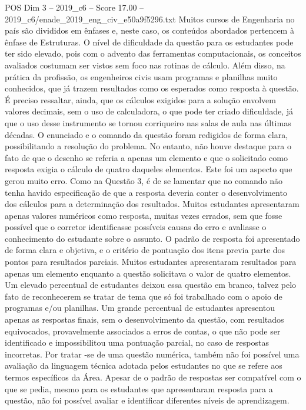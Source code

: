 \begin{textsample}{POS Dim 3 – 2019\_c6 – Score 17.00 – 2019\_c6/enade\_2019\_eng\_civ\_e50a9f5296.txt}
Muitos cursos de Engenharia no país são divididos em ênfases e, neste caso, os conteúdos abordados pertencem à ênfase de Estruturas.
O nível de dificuldade da questão para os estudantes pode ter sido elevado, pois com o advento das ferramentas computacionais, os conceitos avaliados costumam ser vistos sem foco nas rotinas de cálculo.
Além disso, na prática da profissão, os engenheiros civis usam programas e planilhas muito conhecidos, que já trazem resultados como os esperados como resposta à questão.
É preciso ressaltar, ainda, que os cálculos exigidos para a solução envolvem valores decimais, sem o uso de calculadora, o que pode ter criado dificuldade, já que o uso desse instrumento se tornou corriqueiro nas salas de aula nas últimas décadas.
O enunciado e o comando da questão foram redigidos de forma clara, possibilitando a resolução do problema.
No entanto, não houve destaque para o fato de que o desenho se referia a apenas um elemento e que o solicitado como resposta exigia o cálculo de quatro daqueles elementos.
Este foi um aspecto que gerou muito erro.
Como na Questão 3, é de se lamentar que no comando não tenha havido especificação de que a resposta deveria conter o desenvolvimento dos cálculos para a determinação dos resultados.
Muitos estudantes apresentaram apenas valores numéricos como resposta, muitas vezes errados, sem que fosse possível que o corretor identificasse possíveis causas do erro e avaliasse o conhecimento do estudante sobre o assunto.
O padrão de resposta foi apresentado de forma clara e objetiva, e o critério de pontuação dos itens previa parte dos pontos para resultados parciais.
Muitos estudantes apresentaram resultados para apenas um elemento enquanto a questão solicitava o valor de quatro elementos.
Um elevado percentual de estudantes deixou essa questão em branco, talvez pelo fato de reconhecerem se tratar de tema que só foi trabalhado com o apoio de programas e/ou planilhas.
Um grande percentual de estudantes apresentou apenas as respostas finais, sem o desenvolvimento da questão, com resultados equivocados, provavelmente associados a erros de contas, o que não pode ser identificado e impossibilitou uma pontuação parcial, no caso de respostas incorretas.
Por tratar -se de uma questão numérica, também não foi possível uma avaliação da linguagem técnica adotada pelos estudantes no que se refere aos termos específicos da Área.
Apesar de o padrão de respostas ser compatível com o que se pedia, mesmo para os estudantes que apresentaram resposta para a questão, não foi possível avaliar e identificar diferentes níveis de aprendizagem.

\end{textsample}
